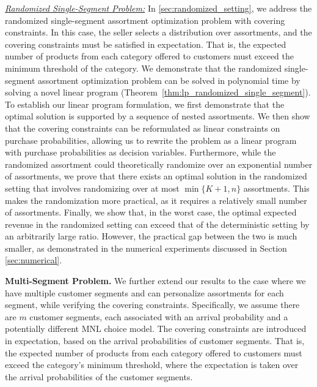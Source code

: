 \documentclass[msom,non-blindrev]{informs3} %
\theoremstyle{definition}
\begin{document}
\noindent\underline{\textit{Randomized Single-Segment Problem:}} In \cref{sec:randomized_setting}, we address the randomized single-segment assortment optimization problem with covering constraints. In this case, the seller selects a distribution over assortments, and the covering constraints must be satisfied in expectation. That is, the expected number of products from each category {  offered} to customers must exceed the minimum threshold of the category. We demonstrate that the randomized single-segment assortment optimization problem can be solved in polynomial time by solving a novel linear program (Theorem~\ref{thm:lp_randomized_single_segment}). To establish our linear program formulation, we first demonstrate that the optimal solution is supported by a sequence of nested assortments. We then show that the covering constraints can be reformulated as linear constraints on purchase probabilities, allowing us to rewrite the problem as a linear program with purchase probabilities as decision variables. 
Furthermore, while the randomized assortment could theoretically randomize over an exponential number of assortments, we prove that there exists an optimal solution in the randomized setting that involves randomizing over at most  \(\min\{K+1,n\}\) assortments. This makes the randomization more practical, as it requires a relatively small number of assortments.
Finally, we show that, in the worst case, the optimal expected revenue in the randomized setting can exceed that of the deterministic setting by an arbitrarily large ratio. However, the practical gap between the two is much smaller, as demonstrated in the numerical experiments discussed in Section \ref{sec:numerical}.















\vspace{3mm}

\noindent\textbf{Multi-Segment Problem.} We further extend our results to the case where we have multiple customer segments and can personalize assortments for each segment, while verifying the covering constraints. Specifically, we assume there are $m$ customer segments, each associated with an arrival probability and a potentially different MNL choice model. The covering constraints are introduced in expectation, based on the arrival probabilities of customer segments. That is, the expected number of products from each category {  offered} to customers must exceed the category's minimum threshold, where the expectation is taken over the arrival probabilities of the customer segments.
\end{document}
